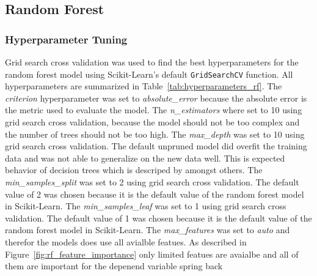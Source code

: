 \subsection{Random Forest}

\subsubsection*{Hyperparameter Tuning}
Grid search cross validation was used to find the best hyperparameters for the random forest model using Scikit-Learn's default \texttt{GridSearchCV} function.
All hyperparameters are summarized in Table~\ref{tab:hyperparameters_rf}.
The \textit{criterion} hyperparameter was set to \textit{absolute\_error} because the absolute error is the metric used to evaluate the model.
The \textit{n\_estimators} where set to 10 using grid search cross validation, because the model should not be too complex and the number of trees should not be too high.
The \textit{max\_depth} was set to 10 using grid search cross validation. The default unpruned model did overfit the training data and was not able to generalize on the new data well. This is expected behavior of decision trees which is descriped by \cite[p. 133-136]{muller_introductionmachinelearning_2016} amongst others.
The \textit{min\_samples\_split} was set to 2 using grid search cross validation. The default value of 2 was chosen because it is the default value of the random forest model in Scikit-Learn.
The \textit{min\_samples\_leaf} was set to 1 using grid search cross validation. The default value of 1 was chosen because it is the default value of the random forest model in Scikit-Learn.
The \textit{max\_features} was set to \textit{auto} and therefor the models does use all avialble featues. As described in Figure~\ref{fig:rf_feature_importance} only limited featues are avaialbe and all of them are important for the depenend variable spring back

